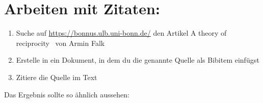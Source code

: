 \newpage

\section{Arbeiten mit Zitaten:}
\begin{enumerate}
\item Suche auf \url{https://bonnus.ulb.uni-bonn.de/} den Artikel \glqq A theory of reciprocity\grqq~ von Armin Falk
\item Erstelle in ein Dokument, in dem du die genannte Quelle als Bibitem einfügst 
\item Zitiere die Quelle im Text
\end{enumerate}

\begin{minipage}[h]{\textwidth}
Das Ergebnis sollte so ähnlich aussehen:

\end{minipage}
\vspace{1cm}

